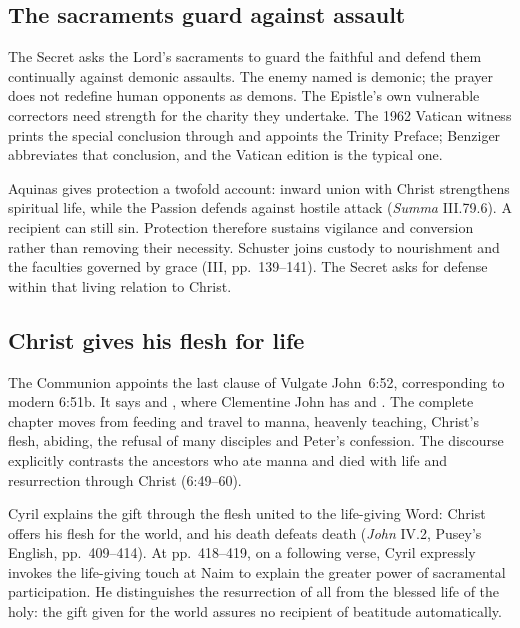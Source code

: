 \subsection*{The sacraments guard against assault\enspace{}}

The Secret asks the Lord's sacraments to guard the faithful and defend them
continually against demonic assaults. The enemy named is demonic; the
prayer does not redefine human opponents as demons. The Epistle's own
vulnerable correctors need strength for the charity they undertake.
The 1962 Vatican witness prints the special conclusion through
 and appoints the Trinity Preface; Benziger abbreviates
that conclusion, and the Vatican edition is the typical one.

Aquinas gives protection a twofold account: inward union with Christ
strengthens spiritual life, while the Passion defends against hostile
attack (\emph{Summa} III.79.6). A recipient can still sin. Protection
therefore sustains vigilance and conversion rather than removing their
necessity. Schuster joins custody to nourishment and the faculties governed
by grace (III, pp.~139--141). The Secret asks for defense within that
living relation to Christ.

\subsection*{Christ gives his flesh for life\enspace{}}

The Communion appoints the last clause of Vulgate John~6:52, corresponding
to modern 6:51b. It says  and , where
Clementine John has  and . The complete chapter
moves from feeding and travel to manna, heavenly teaching, Christ's flesh,
abiding, the refusal of many disciples and Peter's confession.
The discourse explicitly contrasts the ancestors who ate manna and died
with life and resurrection through Christ (6:49--60).

Cyril explains the gift through the flesh united to the life-giving Word:
Christ offers his flesh for the world, and his death defeats death
(\emph{John} IV.2, Pusey's English, pp.~409--414).
At pp.~418--419, on a following verse, Cyril expressly invokes the
life-giving touch at Naim to explain the greater power of sacramental
participation. He distinguishes the resurrection of all from the
blessed life of the holy: the gift given for the world assures no
recipient of beatitude automatically.


